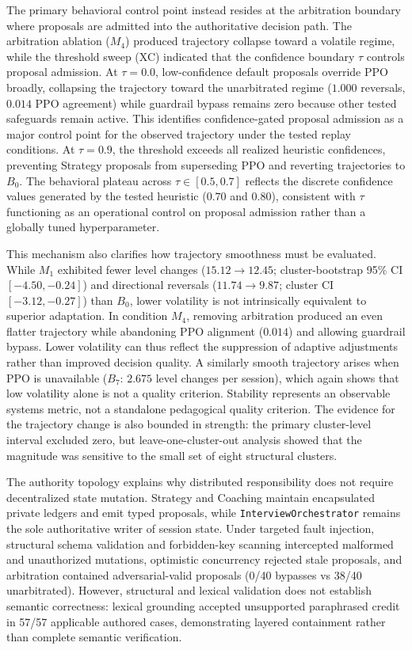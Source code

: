 The primary behavioral control point instead resides at the arbitration boundary where proposals are admitted into the authoritative decision path. The arbitration ablation ($M_4$) produced trajectory collapse toward a volatile regime, while the threshold sweep (XC) indicated that the confidence boundary $\tau$ controls proposal admission. At $\tau = 0.0$, low-confidence default proposals override PPO broadly, collapsing the trajectory toward the unarbitrated regime ($1.000$ reversals, $0.014$ PPO agreement) while guardrail bypass remains zero because other tested safeguards remain active. This identifies confidence-gated proposal admission as a major control point for the observed trajectory under the tested replay conditions. At $\tau = 0.9$, the threshold exceeds all realized heuristic confidences, preventing Strategy proposals from superseding PPO and reverting trajectories to $B_0$. The behavioral plateau across $\tau \in [0.5, 0.7]$ reflects the discrete confidence values generated by the tested heuristic ($0.70$ and $0.80$), consistent with $\tau$ functioning as an operational control on proposal admission rather than a globally tuned hyperparameter.

This mechanism also clarifies how trajectory smoothness must be evaluated. While $M_1$ exhibited fewer level changes ($15.12 \to 12.45$; cluster-bootstrap 95\% CI $[-4.50, -0.24]$) and directional reversals ($11.74 \to 9.87$; cluster CI $[-3.12, -0.27]$) than $B_0$, lower volatility is not intrinsically equivalent to superior adaptation. In condition $M_4$, removing arbitration produced an even flatter trajectory while abandoning PPO alignment ($0.014$) and allowing guardrail bypass. Lower volatility can thus reflect the suppression of adaptive adjustments rather than improved decision quality. A similarly smooth trajectory arises when PPO is unavailable ($B_7$: $2.675$ level changes per session), which again shows that low volatility alone is not a quality criterion. Stability represents an observable systems metric, not a standalone pedagogical quality criterion. The evidence for the trajectory change is also bounded in strength: the primary cluster-level interval excluded zero, but leave-one-cluster-out analysis showed that the magnitude was sensitive to the small set of eight structural clusters.

The authority topology explains why distributed responsibility does not require decentralized state mutation. Strategy and Coaching maintain encapsulated private ledgers and emit typed proposals, while \texttt{InterviewOrchestrator} remains the sole authoritative writer of session state. Under targeted fault injection, structural schema validation and forbidden-key scanning intercepted malformed and unauthorized mutations, optimistic concurrency rejected stale proposals, and arbitration contained adversarial-valid proposals (0/40 bypasses vs 38/40 unarbitrated). However, structural and lexical validation does not establish semantic correctness: lexical grounding accepted unsupported paraphrased credit in 57/57 applicable authored cases, demonstrating layered containment rather than complete semantic verification.

